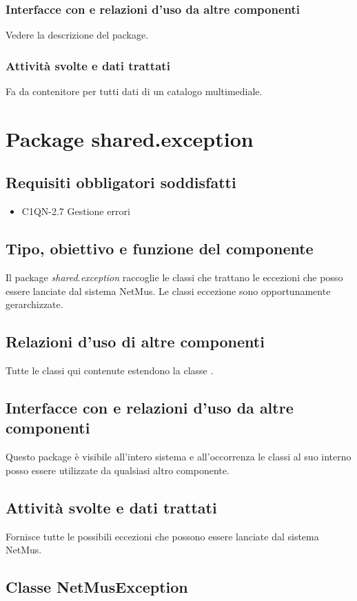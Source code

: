 \subsubsection*{Interfacce con e relazioni d'uso da altre componenti}
Vedere la descrizione del package.
\subsubsection*{Attivit\`a svolte e dati trattati}
Fa da contenitore per tutti dati di un catalogo multimediale.

\newpage
\section{Package shared.exception}
\subsection*{Requisiti obbligatori soddisfatti}
\begin{itemize}
	\item C1QN-2.7 Gestione errori
\end{itemize}
\subsection*{Tipo, obiettivo e funzione del componente}
Il package \emph{shared.exception} raccoglie le classi che trattano
le eccezioni che posso essere lanciate dal sistema NetMus. Le classi eccezione
sono opportunamente gerarchizzate. 
\subsection*{Relazioni d'uso di altre componenti}
Tutte le classi qui contenute estendono la classe .
\subsection*{Interfacce con e relazioni d'uso da altre componenti}
Questo package \`e visibile all'intero sistema e all'occorrenza le classi al suo
interno posso essere utilizzate da qualsiasi altro componente.
\subsection*{Attivit\`a svolte e dati trattati}
Fornisce tutte le possibili eccezioni che possono essere lanciate dal sistema
NetMus.

\subsection{Classe NetMusException}
